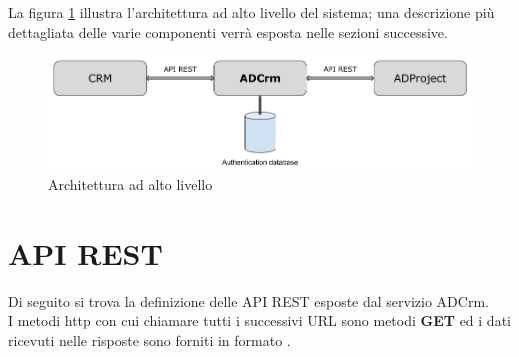 La figura \ref{fig:architetturasistema} illustra l'architettura ad alto livello del sistema; una descrizione più dettagliata delle varie componenti verrà esposta nelle sezioni successive.

\begin{figure}[H]
	\centering
	\includegraphics[width=\linewidth]{images/architettura_sistema}
	\caption{Architettura ad alto livello}
	\label{fig:architetturasistema}
\end{figure}

\section{API REST}\label{apiRest}
Di seguito si trova la definizione delle API REST esposte dal servizio ADCrm.\\
I metodi http con cui chiamare tutti i successivi URL sono metodi \textbf{GET} ed i dati ricevuti nelle risposte sono forniti in formato .

